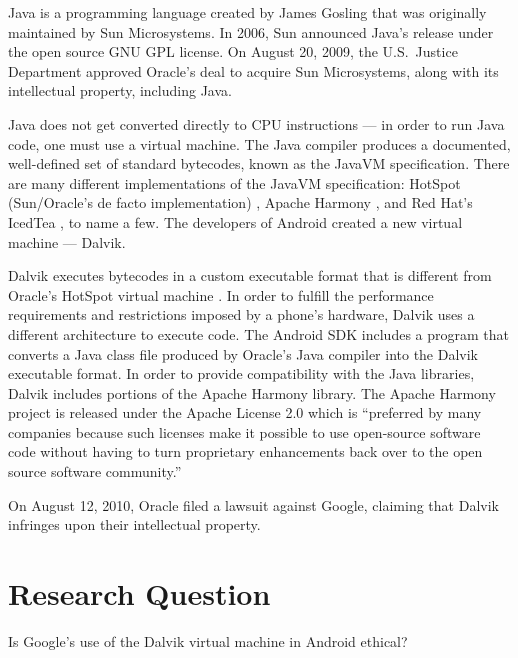 \documentclass[11pt]{article}
\begin{document}
\begin{multicols}{2}
Java is a programming language created by James Gosling that was originally
maintained by Sun Microsystems.  In 2006, Sun announced Java's release under the
open source GNU GPL license. \cite{sun-open-sources-java} On August 20, 2009,
the U.S.~Justice Department approved Oracle's deal to acquire Sun Microsystems,
along with its intellectual property, including Java. \cite{oracle-buys-sun}

Java does not get converted directly to CPU instructions --- in order to run
Java code, one must use a virtual machine. The Java compiler produces a
documented, well-defined set of standard bytecodes, known as the JavaVM
specification. \cite[Chapter 4]{javavm-bytecode}  There are many different
implementations of the JavaVM specification: HotSpot (Sun/Oracle's de facto
implementation) \cite{hotspot}, Apache Harmony \cite{apache-harmony}, and Red
Hat's IcedTea \cite{icedtea}, to name a few.  The developers of Android created
a new virtual machine --- Dalvik.

Dalvik executes bytecodes in a custom executable format \cite{dalvik-bytecode}
that is different from Oracle's HotSpot virtual machine \cite{javavm-bytecode}.
In order to fulfill the performance requirements and restrictions imposed by a
phone's hardware, Dalvik uses a different architecture to execute code.  The
Android SDK includes a program that converts a Java class file produced by
Oracle's Java compiler into the Dalvik executable format.
\cite{android-sdk-building}  In order to provide compatibility with the Java
libraries, Dalvik includes portions of the Apache Harmony library.
\cite{apache-harmony} \cite{dalvik-readme}  The Apache Harmony project is
released under the Apache License 2.0 \cite{apache-license} which is ``preferred
by many companies because such licenses make it possible to use open-source
software code without having to turn proprietary enhancements back over to the
open source software community.'' \cite{why-apache2-license}

On August 12, 2010, Oracle filed a lawsuit against Google, claiming that Dalvik
infringes upon their intellectual property. \cite{oracle-lawsuit}


\section{Research Question} %
\label{sec:question}
Is Google's use of the Dalvik virtual machine in Android ethical?


\end{multicols}
\end{document}
